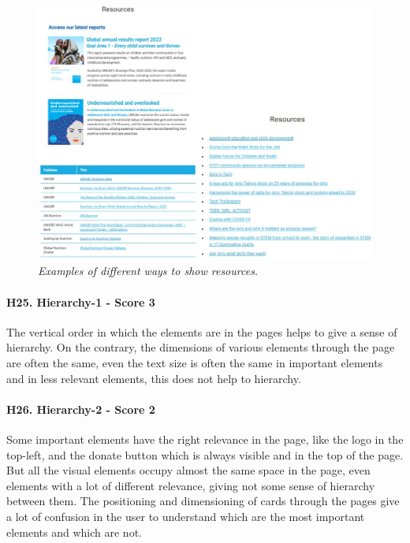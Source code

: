 \begin{figure}[!h]
	\begin{center}
		\includegraphics[width=\textwidth]{FinalScores29.jpg}
		\captionsetup{font=small}
		\caption{\textit{Examples of different ways to show resources.}}
	\end{center}
\end{figure}
\newline
\newline \paragraph{H25. Hierarchy-1 - Score 3}	The vertical order in which the elements are in the pages helps to give a sense of hierarchy. On the contrary, the dimensions of various elements through the page are often the same, even the text size is often the same in important elements and in less relevant elements, this does not help to hierarchy.
\newline
\newline \paragraph{H26. Hierarchy-2 - Score 2}	Some important elements have the right relevance in the page, like the logo in the top-left, and the donate button which is always visible and in the top of the page.
\newline But all the visual elements occupy almost the same space in the page, even elements with a lot of different relevance, giving not some sense of hierarchy between them.
\newline The positioning and dimensioning of cards through the pages give a lot of confusion in the user to understand which are the most important elements and which are not.
